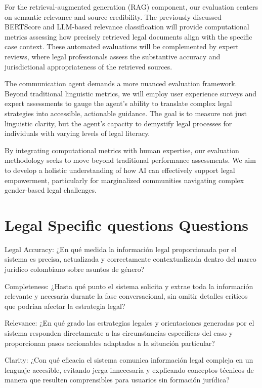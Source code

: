 For the retrieval-augmented generation (RAG) component, our evaluation 
centers on semantic relevance and source credibility. The previously 
discussed BERTScore and LLM-based relevance classification will provide 
computational metrics assessing how precisely retrieved legal documents 
align with the specific case context. These automated evaluations will 
be complemented by expert reviews, where legal professionals assess the 
substantive accuracy and jurisdictional appropriateness of the retrieved 
sources.

The communication agent demands a more nuanced evaluation framework. 
Beyond traditional linguistic metrics, we will employ user experience 
surveys and expert assessments to gauge the agent's ability to translate 
complex legal strategies into accessible, actionable guidance. The goal 
is to measure not just linguistic clarity, but the agent's capacity to 
demystify legal processes for individuals with varying levels of legal 
literacy.


By integrating computational metrics with human expertise, our evaluation 
methodology seeks to move beyond traditional performance assessments. 
We aim to develop a holistic understanding of how AI can effectively 
support legal empowerment, particularly for marginalized communities 
navigating complex gender-based legal challenges.

\section{Legal Specific questions Questions}
Legal Accuracy:
¿En qué medida la información legal proporcionada por el sistema es precisa, actualizada y correctamente contextualizada dentro del marco jurídico colombiano sobre asuntos de género?

Completeness:
¿Hasta qué punto el sistema solicita y extrae toda la información relevante y necesaria durante la fase conversacional, sin omitir detalles críticos que podrían afectar la estrategia legal?

Relevance:
¿En qué grado las estrategias legales y orientaciones generadas por el sistema responden directamente a las circunstancias específicas del caso y proporcionan pasos accionables adaptados a la situación particular?

Clarity:
¿Con qué eficacia el sistema comunica información legal compleja en un lenguaje accesible, evitando jerga innecesaria y explicando conceptos técnicos de manera que resulten comprensibles para usuarios sin formación jurídica?

